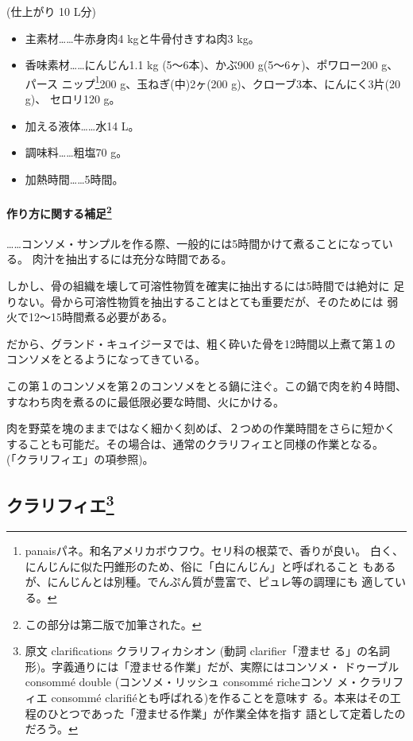 (仕上がり 10 L分)

\begin{itemize}
\item
  主素材\ldots{}\ldots{}牛赤身肉4 kgと牛骨付きすね肉3 kg。
\item
  香味素材\ldots{}\ldots{}にんじん1.1 kg (5〜6本)、かぶ900
  g(5〜6ヶ)、ポワロー200 g、パース ニップ\footnote{panaisパネ。和名アメリカボウフウ。セリ科の根菜で、香りが良い。
    白く、にんじんに似た円錐形のため、俗に「白にんじん」と呼ばれること
    もあるが、にんじんとは別種。でんぷん質が豊富で、ピュレ等の調理にも
    適している。}200 g、玉ねぎ(中)2ヶ(200
  g)、クローブ3本、にんにく3片(20 g)、 セロリ120 g。
\item
  加える液体\ldots{}\ldots{}水14 L。
\item
  調味料\ldots{}\ldots{}粗塩70 g。
\item
  加熱時間\ldots{}\ldots{}5時間。
\end{itemize}

\hypertarget{ux4f5cux308aux65b9ux306bux95a2ux3059ux308bux88dcux8db33}{%
\paragraph[作り方に関する補足]{\texorpdfstring{作り方に関する補足\footnote{この部分は第二版で加筆された。}}{作り方に関する補足}}\label{ux4f5cux308aux65b9ux306bux95a2ux3059ux308bux88dcux8db33}}

\ldots{}\ldots{}コンソメ・サンプルを作る際、一般的には5時間かけて煮ることになっている。
肉汁を抽出するには充分な時間である。

しかし、骨の組織を壊して可溶性物質を確実に抽出するには5時間では絶対に
足りない。骨から可溶性物質を抽出することはとても重要だが、そのためには
弱火で12〜15時間煮る必要がある。

だから、グランド・キュイジーヌでは、粗く砕いた骨を12時間以上煮て第１の
コンソメをとるようになってきている。

この第１のコンソメを第２のコンソメをとる鍋に注ぐ。この鍋で肉を約４時間、
すなわち肉を煮るのに最低限必要な時間、火にかける。

肉を野菜を塊のままではなく細かく刻めば、２つめの作業時間をさらに短かく
することも可能だ。その場合は、通常のクラリフィエと同様の作業となる。
(「クラリフィエ」の項参照)。

\hypertarget{ux30afux30e9ux30eaux30d5ux30a3ux30a84}{%
\subsection[クラリフィエ]{\texorpdfstring{クラリフィエ\footnote{原文
  clarifications クラリフィカシオン (動詞 clarifier「澄ませ
  る」の名詞形)。字義通りには「澄ませる作業」だが、実際にはコンソメ・
  ドゥーブルconsommé double (コンソメ・リッシュ consommé richeコンソ
  メ・クラリフィエ consommé clarifiéとも呼ばれる)を作ることを意味す
  る。本来はその工程のひとつであった「澄ませる作業」が作業全体を指す
  語として定着したのだろう。}}{クラリフィエ}}\label{ux30afux30e9ux30eaux30d5ux30a3ux30a84}}

